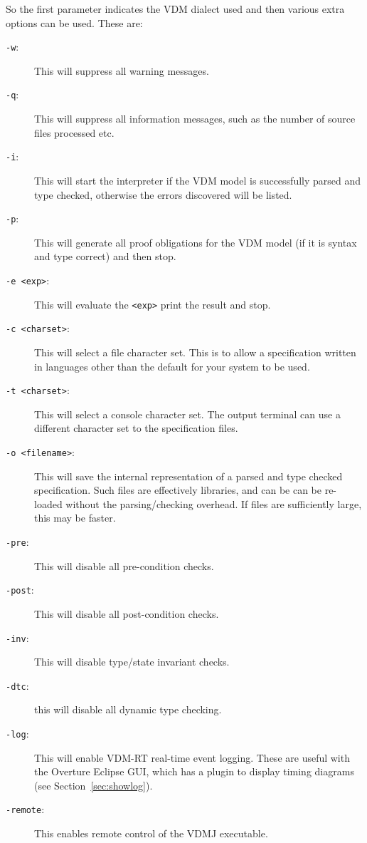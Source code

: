 \documentclass{overturerepsec}
\begin{document}
So the first parameter indicates the VDM dialect used and then
various extra options can be used. These are:

\begin{description}
\item[\texttt{-w}:] This will suppress all warning messages.
\item[\texttt{-q}:] This will suppress all information messages, such as
 the number of source files processed etc.
\item[\texttt{-i}:] This will start the interpreter if the VDM
  model is successfully parsed and type checked, otherwise the errors discovered
  will be listed.
\item[\texttt{-p}:] This will generate all proof obligations for the
  VDM model (if it is syntax and type correct) and then 
  stop.
\item[\texttt{-e <exp>}:] This will evaluate the \texttt{<exp>} print
  the result and stop.
\item[\texttt{-c <charset>}:] This will select a file character set. This is to
allow a specification written in languages other than the default for your system
to be used. 
\item[\texttt{-t <charset>}:] This will select a console character set. The output
terminal can use a different character set to the specification files.
\item[\texttt{-o <filename>}:] This will save the internal
  representation of a parsed and type checked spe\-ci\-fication. Such files are
effectively libraries, and can be can be re-loaded without the
parsing/checking overhead. If files are sufficiently large, this may be faster.
\item[\texttt{-pre}:] This will disable all pre-condition checks.
\item[\texttt{-post}:] This will disable all post-condition checks.
\item[\texttt{-inv}:] This will disable type/state invariant checks.
\item[\texttt{-dtc}:] this will disable all dynamic type checking.
\item[\texttt{-log}:] This will enable VDM-RT real-time event logging. These
  are useful with the Overture Eclipse GUI, which has a plugin to
  display timing diagrams (see Section~\ref{sec:showlog}).
\item [\texttt{-remote}:] This enables remote control of the VDMJ executable.
\end{description}

\end{document}

